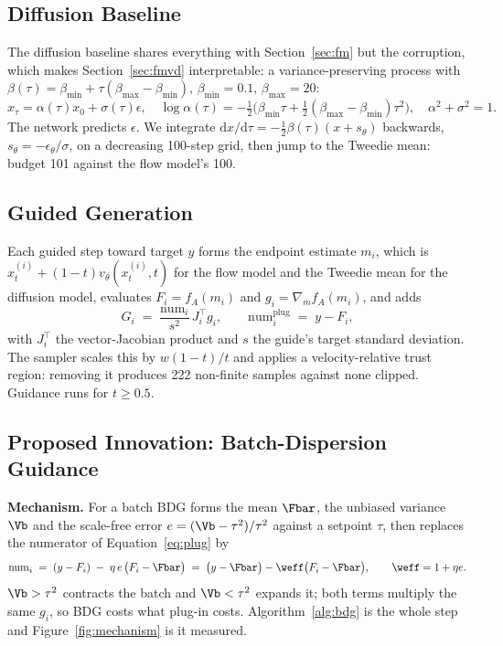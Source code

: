 \subsection{Diffusion Baseline}
\label{sec:diff}

The diffusion baseline shares everything with Section~\ref{sec:fm} but the corruption,
which makes Section~\ref{sec:fmvd} interpretable: a variance-preserving process with
$\beta(\tau)=\beta_{\min}+\tau(\beta_{\max}-\beta_{\min})$, $\beta_{\min}=0.1$,
$\beta_{\max}=20$:
\begin{equation}
x_\tau=\alpha(\tau)x_0+\sigma(\tau)\epsilon,
\quad
\log\alpha(\tau)=-\tfrac12\big(\beta_{\min}\tau+\tfrac12(\beta_{\max}-\beta_{\min})\tau^2\big),
\quad \alpha^2+\sigma^2=1 .
\label{eq:vp}
\end{equation}
The network predicts $\epsilon$. We integrate
$\mathrm{d}x/\mathrm{d}\tau=-\tfrac12\beta(\tau)(x+s_\theta)$ backwards,
$s_\theta=-\epsilon_\theta/\sigma$, on a decreasing 100-step grid, then jump to the
Tweedie mean: budget 101 against the flow model's 100.

\subsection{Guided Generation}
\label{sec:guidance}

Each guided step toward target $y$ forms the endpoint estimate $m_i$, which is
$x_t^{(i)}+(1-t)v_\theta(x_t^{(i)},t)$ for the flow model and the Tweedie mean for the
diffusion model, evaluates $F_i=f_A(m_i)$ and $g_i=\nabla_m f_A(m_i)$, and adds
\begin{equation}
G_i \;=\; \frac{\mathrm{num}_i}{s^2}\,J_i^{\!\top} g_i ,
\qquad
\mathrm{num}_i^{\mathrm{plug}} \;=\; y - F_i ,
\label{eq:plug}
\end{equation}
with $J_i^{\!\top}$ the vector-Jacobian product and $s$ the guide's target standard
deviation. The sampler scales this by $w(1-t)/t$ and applies a velocity-relative trust
region: removing it produces 222 non-finite samples against none clipped. Guidance runs
for $t\ge0.5$.

\subsection{Proposed Innovation: Batch-Dispersion Guidance}
\label{sec:bdg}

\textbf{Mechanism.} For a batch BDG forms the mean $\Fbar$, the unbiased variance $\Vb$
and the scale-free error $e=(\Vb-\tau^2)/\tau^2$ against a setpoint $\tau$, then
replaces the numerator of Equation~\eqref{eq:plug} by
\begin{equation}
\mathrm{num}_i \;=\; (y-F_i)\;-\;\eta\,e\,\big(F_i-\Fbar\big)
\;=\;\big(y-\Fbar\big)-\weff\big(F_i-\Fbar\big),
\qquad \weff=1+\eta e .
\label{eq:bdgnum}
\end{equation}
$\Vb>\tau^2$ contracts the batch and $\Vb<\tau^2$ expands it; both terms multiply the
same $g_i$, so BDG costs what plug-in costs. Algorithm~\ref{alg:bdg} is the whole step
and Figure~\ref{fig:mechanism} is it measured.

